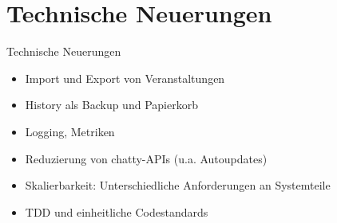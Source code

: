 \documentclass[10pt]{beamer}
\begin{document}
\section{Technische Neuerungen}
\begin{frame}{Technische Neuerungen}
	\begin{itemize}
		\item<+-> Import und Export von Veranstaltungen
		\item<+-> History als Backup und Papierkorb
		\item<+-> Logging, Metriken
		\item<+-> Reduzierung von chatty-APIs (u.a. Autoupdates)
		\item<+-> Skalierbarkeit: Unterschiedliche Anforderungen an Systemteile
		\item<+-> TDD und einheitliche Codestandards
	\end{itemize}
\end{frame}
\end{document}
